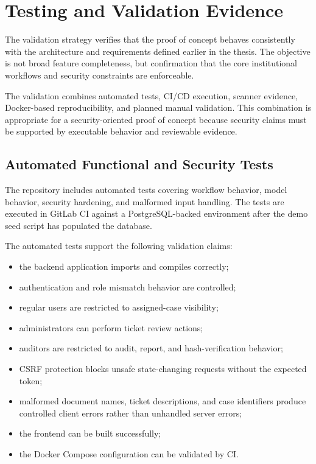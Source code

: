\documentclass[12pt,a4paper]{report}
\begin{document}
\section{Testing and Validation Evidence}

The validation strategy verifies that the proof of concept behaves consistently with the architecture and requirements defined earlier in the thesis. The objective is not broad feature completeness, but confirmation that the core institutional workflows and security constraints are enforceable.

The validation combines automated tests, CI/CD execution, scanner evidence, Docker-based reproducibility, and planned manual validation. This combination is appropriate for a security-oriented proof of concept because security claims must be supported by executable behavior and reviewable evidence.

\subsection{Automated Functional and Security Tests}

The repository includes automated tests covering workflow behavior, model behavior, security hardening, and malformed input handling. The tests are executed in GitLab CI against a PostgreSQL-backed environment after the demo seed script has populated the database.

The automated tests support the following validation claims:

\begin{itemize}
    \item the backend application imports and compiles correctly;
    \item authentication and role mismatch behavior are controlled;
    \item regular users are restricted to assigned-case visibility;
    \item administrators can perform ticket review actions;
    \item auditors are restricted to audit, report, and hash-verification behavior;
    \item CSRF protection blocks unsafe state-changing requests without the expected token;
    \item malformed document names, ticket descriptions, and case identifiers produce controlled client errors rather than unhandled server errors;
    \item the frontend can be built successfully;
    \item the Docker Compose configuration can be validated by CI.
\end{itemize}
\end{document}
